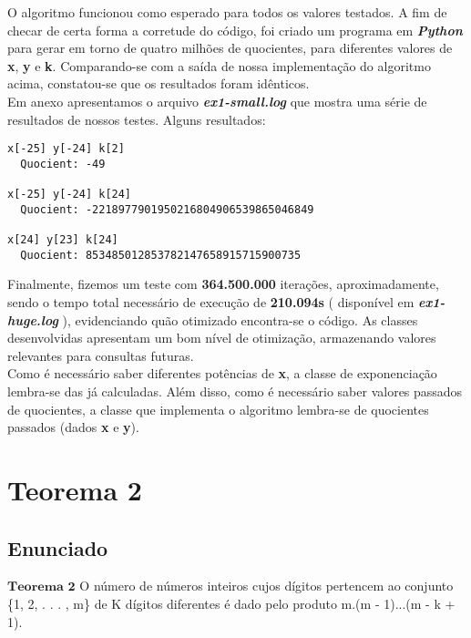 \documentclass[twoside]{article}
\begin{document}
\begin{multicols}{2}
\indent O algoritmo funcionou como esperado para todos os valores testados. A fim de checar de certa forma a corretude do código, foi criado um programa em \textbf{\textit{Python}} para gerar em torno de quatro milhões de quocientes, para diferentes valores de \textbf{x}, \textbf{y} e \textbf{k}. Comparando-se com a saída de nossa implementação do algoritmo acima, constatou-se que os resultados foram idênticos.\\

\indent Em anexo apresentamos o arquivo \textbf{\textit{ex1-small.log}} que mostra uma série de resultados de nossos testes. Alguns resultados:

\begin{lstlisting}
x[-25] y[-24] k[2]
  Quocient: -49

x[-25] y[-24] k[24]
  Quocient: -2218977901950216804906539865046849

x[24] y[23] k[24]
  Quocient: 853485012853782147658915715900735

\end{lstlisting}

\indent Finalmente, fizemos um teste com \textbf{364.500.000} iterações, aproximadamente, sendo o tempo total necessário de execução de \textbf{210.094s} ( disponível em \textbf{\textit{ex1-huge.log}} ), evidenciando quão otimizado encontra-se o código. As classes desenvolvidas apresentam um bom nível de otimização, armazenando valores relevantes para consultas futuras.\\

\indent Como é necessário saber diferentes potências de \textbf{x}, a classe de exponenciação lembra-se das já calculadas. Além disso, como é necessário saber valores passados de quocientes, a classe que implementa o algoritmo lembra-se de quocientes passados (dados \textbf{x} e \textbf{y}).



\section{Teorema 2}

\subsection{ Enunciado }
\indent $\mathbf{Teorema}$ $\mathbf{2}$ O número de números inteiros cujos dígitos pertencem ao conjunto \{1, 2, . . . , m\} de
K dígitos diferentes é dado pelo produto m.(m - 1)...(m - k + 1).\\


\end{multicols}
\end{document}
